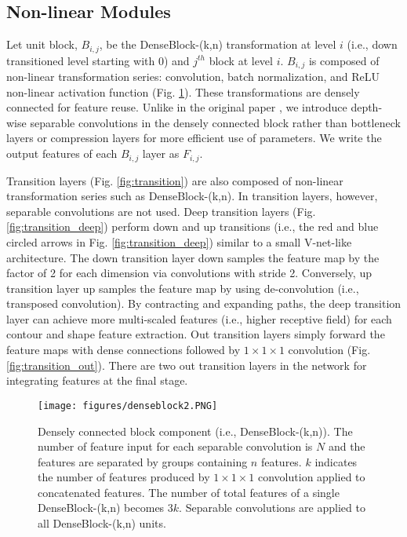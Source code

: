 \documentclass[journal]{IEEEtran}
\begin{document}
\subsection{Non-linear Modules}
Let unit block, \(B_{i,j}\), be the DenseBlock-(k,n) transformation at level \(i\) (i.e., down transitioned level starting with \(0\)) and \(j^{th}\) block at level \(i\). \(B_{i,j}\) is composed of non-linear transformation series: convolution, batch normalization, and ReLU non-linear activation function (Fig. \ref{fig:denseblock}). These transformations are densely connected for feature reuse. Unlike in the original paper \cite{huang2017densely}, we introduce depth-wise separable convolutions \cite{chollet2017xception} in the densely connected block rather than bottleneck layers \cite{szegedy2016rethinking} or compression layers \cite{huang2017densely} for more efficient use of parameters. We write the output features of each \(B_{i,j}\) layer as \(F_{i,j}\).\par

Transition layers (Fig. \ref{fig:transition}) are also composed of non-linear transformation series such as DenseBlock-(k,n). In transition layers, however, separable convolutions are not used. Deep transition layers (Fig. \ref{fig:transition_deep}) perform down and up transitions (i.e., the red and blue circled arrows in Fig. \ref{fig:transition_deep}) similar to a small V-net-like architecture. The down transition layer down samples the feature map by the factor of 2 for each dimension via convolutions with stride 2. Conversely, up transition layer up samples the feature map by using de-convolution (i.e., transposed convolution). By contracting and expanding paths, the deep transition layer can achieve more multi-scaled features (i.e., higher receptive field) for each contour and shape feature extraction. Out transition layers simply forward the feature maps with dense connections followed by $1\times1\times1$ convolution (Fig. \ref{fig:transition_out}). There are two out transition layers in the network for integrating features at the final stage.\par

\begin{figure}[t]
    \centering
    \texttt{[image: figures/denseblock2.PNG]}
    \caption{Densely connected block component (i.e., DenseBlock-(k,n)). The number of feature input for each separable convolution is $N$ and the features are separated by groups containing $n$ features. \(k\) indicates the number of features produced by $1\times1\times1$ convolution applied to concatenated features. The number of total features of a single DenseBlock-(k,n) becomes \(3k\). Separable convolutions are applied to all DenseBlock-(k,n) units.}
    \label{fig:denseblock}
\end{figure}
\end{document}
